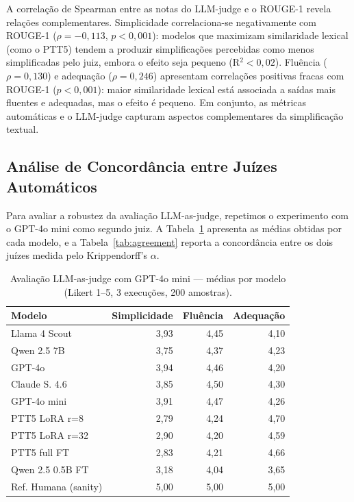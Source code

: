 \documentclass[a4paper, twocolumn, 11pt, twoside]{article}
\begin{document}
A correlação de Spearman entre as notas do LLM-judge e o ROUGE-1
revela relações complementares. Simplicidade correlaciona-se
negativamente com ROUGE-1 ($\rho = -0,113$, $p < 0,001$):
modelos que maximizam similaridade lexical
(como o PTT5) tendem a produzir simplificações percebidas como
menos simplificadas pelo juiz, embora o efeito seja pequeno
(R$^2 < 0,02$). Fluência ($\rho = 0,130$) e adequação ($\rho = 0,246$)
apresentam correlações positivas fracas com ROUGE-1 ($p < 0,001$):
maior similaridade lexical está associada a saídas
mais fluentes e adequadas, mas o efeito é pequeno.
Em conjunto, as métricas automáticas e o LLM-judge capturam aspectos
complementares da simplificação textual.

\subsection{Análise de Concordância entre Juízes Automáticos}

Para avaliar a robustez da avaliação LLM-as-judge, repetimos o
experimento com o GPT-4o mini como segundo juiz. A
Tabela~\ref{tab:llmjudge2} apresenta as médias obtidas por cada modelo,
e a Tabela~\ref{tab:agreement} reporta a concordância entre os dois
juízes medida pelo Krippendorff's $\alpha$.

\begin{table}[htbp]
\centering
\caption{Avaliação LLM-as-judge com GPT-4o mini ---
         médias por modelo (Likert 1--5, 3 execuções, 200 amostras).}
\label{tab:llmjudge2}
\footnotesize
\setlength{\tabcolsep}{3pt}
\begin{tabular}{l r r r}
\toprule
Modelo & Simplicidade & Fluência & Adequação \\
\midrule
Llama 4 Scout        & 3,93 & 4,45 & 4,10 \\
Qwen 2.5 7B          & 3,75 & 4,37 & 4,23 \\
GPT-4o               & 3,94 & 4,46 & 4,20 \\
Claude S. 4.6        & 3,85 & 4,50 & 4,30 \\
GPT-4o mini          & 3,91 & 4,47 & 4,26 \\
PTT5 LoRA r=8        & 2,79 & 4,24 & 4,70 \\
PTT5 LoRA r=32       & 2,90 & 4,20 & 4,59 \\
PTT5 full FT         & 2,83 & 4,21 & 4,66 \\
Qwen 2.5 0.5B FT     & 3,18 & 4,04 & 3,65 \\
\midrule
Ref. Humana (sanity) & 5,00 & 5,00 & 5,00 \\
\bottomrule
\end{tabular}
\end{table}
\end{document}
